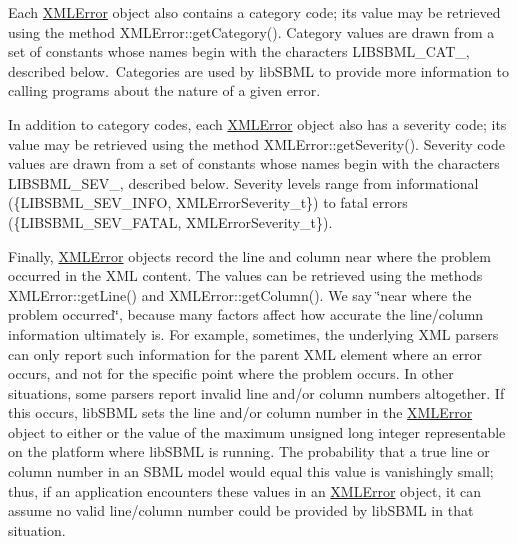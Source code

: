 Each \hyperlink{class_x_m_l_error}{X\+M\+L\+Error} object also contains a category code; its value may be retrieved using the method X\+M\+L\+Error\+::get\+Category(). Category values are drawn from a set of constants whose names begin with the characters {\ttfamily L\+I\+B\+S\+B\+M\+L\+\_\+\+C\+A\+T\+\_\+}, described below.~Categories are used by lib\+S\+B\+ML to provide more information to calling programs about the nature of a given error.

In addition to category codes, each \hyperlink{class_x_m_l_error}{X\+M\+L\+Error} object also has a severity code; its value may be retrieved using the method X\+M\+L\+Error\+::get\+Severity(). Severity code values are drawn from a set of constants whose names begin with the characters {\ttfamily L\+I\+B\+S\+B\+M\+L\+\_\+\+S\+E\+V\+\_\+}, described below. Severity levels range from informational (\{L\+I\+B\+S\+B\+M\+L\+\_\+\+S\+E\+V\+\_\+\+I\+N\+FO, X\+M\+L\+Error\+Severity\+\_\+t\}) to fatal errors (\{L\+I\+B\+S\+B\+M\+L\+\_\+\+S\+E\+V\+\_\+\+F\+A\+T\+AL, X\+M\+L\+Error\+Severity\+\_\+t\}).

Finally, \hyperlink{class_x_m_l_error}{X\+M\+L\+Error} objects record the line and column near where the problem occurred in the X\+ML content. The values can be retrieved using the methods X\+M\+L\+Error\+::get\+Line() and X\+M\+L\+Error\+::get\+Column(). We say \char`\"{}near
where the problem occurred\char`\"{}, because many factors affect how accurate the line/column information ultimately is. For example, sometimes, the underlying X\+ML parsers can only report such information for the parent X\+ML element where an error occurs, and not for the specific point where the problem occurs. In other situations, some parsers report invalid line and/or column numbers altogether. If this occurs, lib\+S\+B\+ML sets the line and/or column number in the \hyperlink{class_x_m_l_error}{X\+M\+L\+Error} object to either {} or the value of the maximum unsigned long integer representable on the platform where lib\+S\+B\+ML is running. The probability that a true line or column number in an S\+B\+ML model would equal this value is vanishingly small; thus, if an application encounters these values in an \hyperlink{class_x_m_l_error}{X\+M\+L\+Error} object, it can assume no valid line/column number could be provided by lib\+S\+B\+ML in that situation.

